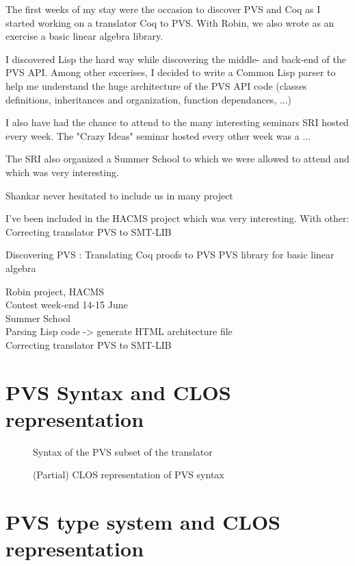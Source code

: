 \documentclass[12pt,a4paper]{article}
\begin{document}
The first weeks of my stay were the occasion to discover PVS and Coq as I started working on a translator Coq to PVS. With Robin, we also wrote as an exercise a basic linear algebra library.

I discovered Lisp the hard way while discovering the middle- and back-end of the PVS API. Among other excerises, I decided to write a Common Lisp parser to help me understand the huge architecture of the PVS API code (classes definitions, inheritances and organization, function dependances, ...)

I also have had the chance to attend to the many interesting seminars SRI hosted every week. The "Crazy Ideas" seminar hosted every other week was a ...

The SRI also organized a Summer School to which we were allowed to attend and which was very interesting.

Shankar never hesitated to include us in many project

I've been included in the HACMS project which was very interesting.
With other:
Correcting translator PVS to SMT-LIB

Discovering PVS :
Translating Coq proofs to PVS
PVS library for basic linear algebra

Robin project, HACMS \\
Contest week-end 14-15 June \\
Summer School \\
Parsing Lisp code -> generate HTML architecture file\\
Correcting translator PVS to SMT-LIB




\printbibliography

\appendix

\newpage
\section{PVS Syntax and CLOS representation}

\begin{figure}[h]

\caption{Syntax of the PVS subset of the translator}
\label{fig:PVSsyntax}
\end{figure}

\begin{figure}[!ht]

\caption{(Partial) CLOS representation of PVS syntax}
\label{fig:PVS-CLOS}
\end{figure}

\newpage
\section{PVS type system and CLOS representation}
\end{document}
